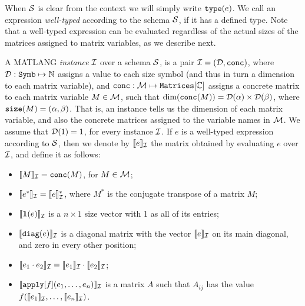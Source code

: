 \medskip

When $\mathcal{S}$ is clear from the context we will simply write $\texttt{type}(e)$. We call an expression {\em well-typed} according to the schema $\mathcal{S}$, if it has a defined type. Note that a well-typed expression can be evaluated regardless of the actual sizes of the matrices assigned to matrix variables, as we describe next.

A MATLANG {\em instance} $\mathcal{I}$ over a schema $\mathcal{S}$, is a pair $\mathcal{I} = (\mathcal{D},\texttt{conc})$, where $\mathcal{D} : \texttt{Symb} \mapsto \mathbb{N}$ assigns a value to each size symbol (and thus in turn a dimension to each matrix variable), and $\texttt{conc} : \mathcal{M} \mapsto \texttt{Matrices}[\mathbb{C}]$ assigns a concrete matrix to each matrix variable $M\in \mathcal{M}$, such that $\dim(\texttt{conc}(M)) = \mathcal{D}(\alpha)\times \mathcal{D}(\beta)$, where $\texttt{size}(M) = (\alpha,\beta)$. That is, an instance tells us the dimension of each matrix variable, and also the concrete matrices assigned to the variable names in $\mathcal{M}$. We assume that $\mathcal{D}(1) = 1$, for every instance $\mathcal{I}$. If $e$ is a well-typed expression according to $\mathcal{S}$, then we denote by $\llbracket e \rrbracket_{\mathcal{I}}$ the matrix obtained by evaluating $e$ over $\mathcal{I}$, and define it as follows:
\begin{itemize}
\item $\llbracket M \rrbracket_{\mathcal{I}} = \texttt{conc}(M)$, for $M\in \mathcal{M}$;
\item $\llbracket e^* \rrbracket_{\mathcal{I}} = \llbracket e \rrbracket_{\mathcal{I}}^*$, where $M^*$ is the conjugate transpose of a matrix $M$;
\item $\llbracket \mathbf{1}(e) \rrbracket_{\mathcal{I}}$ is a $n\times 1$ size vector with 1 as all of its entries;
\item $\llbracket \texttt{diag}(e) \rrbracket_{\mathcal{I}}$ is a diagonal matrix with the vector $\llbracket e \rrbracket_{\mathcal{I}}$ on its main diagonal, and zero in every other position;
\item $\llbracket e_1\cdot e_2 \rrbracket_{\mathcal{I}} = \llbracket e_1 \rrbracket_{\mathcal{I}} \cdot \llbracket e_2 \rrbracket_{\mathcal{I}}$;
\item $\llbracket \texttt{apply}[f](e_1,\ldots ,e_n) \rrbracket_{\mathcal{I}}$ is a matrix $A$ such that $A_{ij}$ has the value $f(\llbracket e_1 \rrbracket_{\mathcal{I}},\ldots ,\llbracket e_n \rrbracket_{\mathcal{I}})$.
\end{itemize}